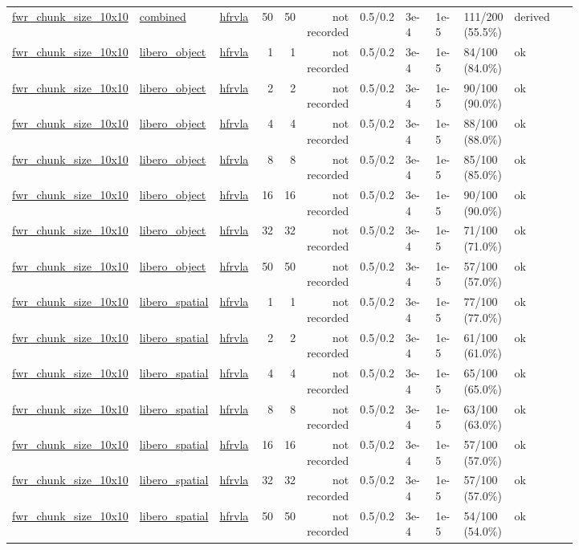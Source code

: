 \begin{tiny}
\begin{longtable}{@{}p{0.18\linewidth}p{0.10\linewidth}p{0.10\linewidth}rrrrp{0.10\linewidth}p{0.08\linewidth}p{0.08\linewidth}p{0.11\linewidth}p{0.07\linewidth}@{}}
\url{fwr_chunk_size_10x10} & \url{combined} & \url{hfrvla} & 50 & 50 & not recorded & 0.5/0.2 & 3e-4 & 1e-5 & 111/200 (55.5\%) & derived \\
\url{fwr_chunk_size_10x10} & \url{libero_object} & \url{hfrvla} & 1 & 1 & not recorded & 0.5/0.2 & 3e-4 & 1e-5 & 84/100 (84.0\%) & ok \\
\url{fwr_chunk_size_10x10} & \url{libero_object} & \url{hfrvla} & 2 & 2 & not recorded & 0.5/0.2 & 3e-4 & 1e-5 & 90/100 (90.0\%) & ok \\
\url{fwr_chunk_size_10x10} & \url{libero_object} & \url{hfrvla} & 4 & 4 & not recorded & 0.5/0.2 & 3e-4 & 1e-5 & 88/100 (88.0\%) & ok \\
\url{fwr_chunk_size_10x10} & \url{libero_object} & \url{hfrvla} & 8 & 8 & not recorded & 0.5/0.2 & 3e-4 & 1e-5 & 85/100 (85.0\%) & ok \\
\url{fwr_chunk_size_10x10} & \url{libero_object} & \url{hfrvla} & 16 & 16 & not recorded & 0.5/0.2 & 3e-4 & 1e-5 & 90/100 (90.0\%) & ok \\
\url{fwr_chunk_size_10x10} & \url{libero_object} & \url{hfrvla} & 32 & 32 & not recorded & 0.5/0.2 & 3e-4 & 1e-5 & 71/100 (71.0\%) & ok \\
\url{fwr_chunk_size_10x10} & \url{libero_object} & \url{hfrvla} & 50 & 50 & not recorded & 0.5/0.2 & 3e-4 & 1e-5 & 57/100 (57.0\%) & ok \\
\url{fwr_chunk_size_10x10} & \url{libero_spatial} & \url{hfrvla} & 1 & 1 & not recorded & 0.5/0.2 & 3e-4 & 1e-5 & 77/100 (77.0\%) & ok \\
\url{fwr_chunk_size_10x10} & \url{libero_spatial} & \url{hfrvla} & 2 & 2 & not recorded & 0.5/0.2 & 3e-4 & 1e-5 & 61/100 (61.0\%) & ok \\
\url{fwr_chunk_size_10x10} & \url{libero_spatial} & \url{hfrvla} & 4 & 4 & not recorded & 0.5/0.2 & 3e-4 & 1e-5 & 65/100 (65.0\%) & ok \\
\url{fwr_chunk_size_10x10} & \url{libero_spatial} & \url{hfrvla} & 8 & 8 & not recorded & 0.5/0.2 & 3e-4 & 1e-5 & 63/100 (63.0\%) & ok \\
\url{fwr_chunk_size_10x10} & \url{libero_spatial} & \url{hfrvla} & 16 & 16 & not recorded & 0.5/0.2 & 3e-4 & 1e-5 & 57/100 (57.0\%) & ok \\
\url{fwr_chunk_size_10x10} & \url{libero_spatial} & \url{hfrvla} & 32 & 32 & not recorded & 0.5/0.2 & 3e-4 & 1e-5 & 57/100 (57.0\%) & ok \\
\url{fwr_chunk_size_10x10} & \url{libero_spatial} & \url{hfrvla} & 50 & 50 & not recorded & 0.5/0.2 & 3e-4 & 1e-5 & 54/100 (54.0\%) & ok \\

\end{longtable}
\end{tiny}
